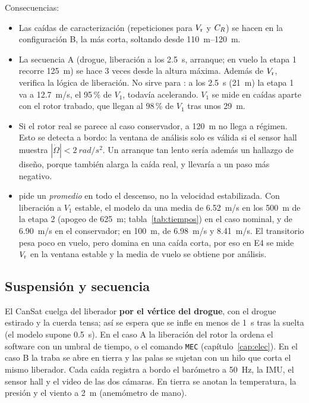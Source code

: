 Consecuencias:
\begin{itemize}
  \item Las caídas de caracterización (repeticiones para $V_{\mathrm{r}}$ y $C_{R}$) se hacen en la
        configuración B, la más corta, soltando desde \SIrange{110}{120}{m}.
  \item La secuencia A (drogue, liberación a los \SI{2.5}{s}, arranque; en vuelo la etapa 1
        recorre \SI{125}{m}) se hace 3 veces desde la altura máxima. Además de $V_{\mathrm{r}}$, verifica
        la lógica de liberación. No sirve para : a los \SI{2.5}{s} (\SI{21}{m}) la
        etapa 1 va a \SI{12.7}{m/s}, el 95\,\% de $V_1$, todavía acelerando. $V_1$ se mide en
        caídas aparte con el rotor trabado, que llegan al 98\,\% de $V_1$ tras unos \SI{29}{m}.
  \item Si el rotor real se parece al caso conservador, a \SI{120}{m} no llega a
        régimen. Esto se detecta a bordo: la ventana de análisis solo es válida si el
        sensor hall muestra $|\dot\Omega|<\SI{2}{rad/s^2}$. Un arranque tan lento sería
        además un hallazgo de diseño, porque también alarga la caída real, y llevaría a un
        paso más negativo.
  \item {} pide un \emph{promedio} en todo el descenso, no la velocidad
        estabilizada. Con liberación a $V_1$ estable, el modelo da una media de
        \SI{6.52}{m/s} en los \SI{500}{m} de la etapa 2 (apogeo de \SI{625}{m};
        tabla~\ref{tab:tiempos}) en el caso nominal, y de \SI{6.90}{m/s} en el conservador;
        en \SI{100}{m}, de \SI{6.98}{m/s} y \SI{8.41}{m/s}. El transitorio pesa poco en vuelo,
        pero domina en una caída corta, por eso en E4 se mide $V_{\mathrm{r}}$ en la ventana estable y
        la media de vuelo se obtiene por análisis.
\end{itemize}

\subsection{Suspensión y secuencia}
El CanSat cuelga del liberador \textbf{por el vértice del drogue}, con el drogue estirado y
la cuerda tensa; así se espera que se infle en menos de \SI{1}{s} tras la suelta (el
modelo supone \SI{0.5}{s}). En el caso A la
liberación del rotor la ordena el software con un umbral de tiempo, o el comando
\texttt{MEC} (capítulo~\ref{cap:elec}). En el caso B la traba se abre en tierra y las palas
se sujetan con un hilo que corta el mismo liberador. Cada caída registra a bordo el
barómetro a \SI{50}{Hz}, la IMU, el sensor hall y el video de las dos cámaras. En tierra se
anotan la temperatura, la presión y el viento a \SI{2}{m} (anemómetro de mano).

